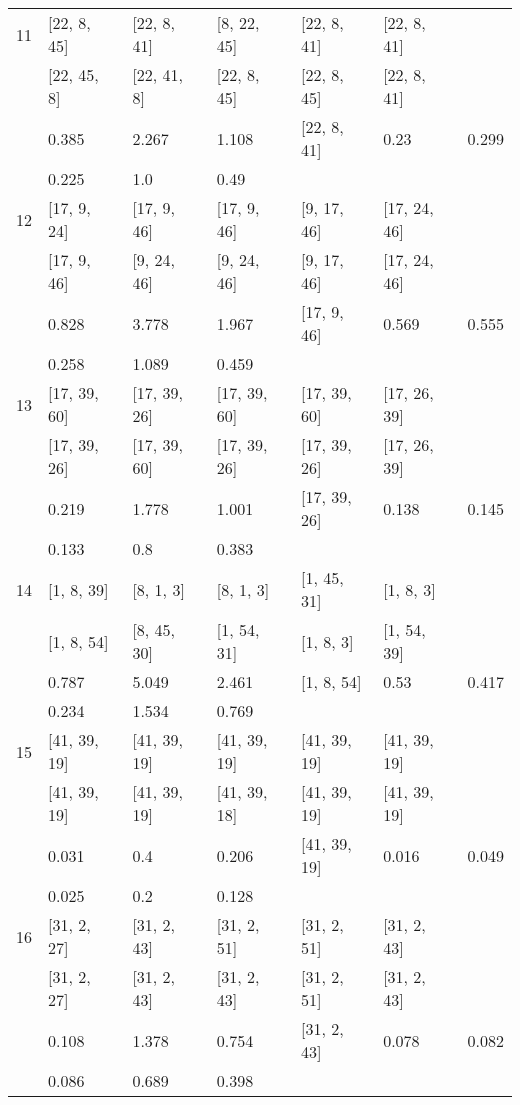 \begin{longtable}{| l || l | l | l | l | l | l | }
\hline
11  & [22, 8, 45] & [22, 8, 41] & [8, 22, 45] & [22, 8, 41] & [22, 8, 41] \\
 & [22, 45, 8] & [22, 41, 8] & [22, 8, 45] & [22, 8, 45] & [22, 8, 41]\\
\hline
& 0.385 & 2.267 & 1.108 & [22, 8, 41] & 0.23 & 0.299\\
\hline
& 0.225 & 1.0 & 0.49 \\
\hline

\hline
12  & [17, 9, 24] & [17, 9, 46] & [17, 9, 46] & [9, 17, 46] & [17, 24, 46] \\
 & [17, 9, 46] & [9, 24, 46] & [9, 24, 46] & [9, 17, 46] & [17, 24, 46]\\
\hline
& 0.828 & 3.778 & 1.967 & [17, 9, 46] & 0.569 & 0.555\\
\hline
& 0.258 & 1.089 & 0.459 \\
\hline

\hline
13  & [17, 39, 60] & [17, 39, 26] & [17, 39, 60] & [17, 39, 60] & [17, 26, 39] \\
 & [17, 39, 26] & [17, 39, 60] & [17, 39, 26] & [17, 39, 26] & [17, 26, 39]\\
\hline
& 0.219 & 1.778 & 1.001 & [17, 39, 26] & 0.138 & 0.145\\
\hline
& 0.133 & 0.8 & 0.383 \\
\hline

\hline
14  & [1, 8, 39] & [8, 1, 3] & [8, 1, 3] & [1, 45, 31] & [1, 8, 3] \\
 & [1, 8, 54] & [8, 45, 30] & [1, 54, 31] & [1, 8, 3] & [1, 54, 39]\\
\hline
& 0.787 & 5.049 & 2.461 & [1, 8, 54] & 0.53 & 0.417\\
\hline
& 0.234 & 1.534 & 0.769 \\
\hline

\hline
15  & [41, 39, 19] & [41, 39, 19] & [41, 39, 19] & [41, 39, 19] & [41, 39, 19] \\
 & [41, 39, 19] & [41, 39, 19] & [41, 39, 18] & [41, 39, 19] & [41, 39, 19]\\
\hline
& 0.031 & 0.4 & 0.206 & [41, 39, 19] & 0.016 & 0.049\\
\hline
& 0.025 & 0.2 & 0.128 \\
\hline

\hline
16  & [31, 2, 27] & [31, 2, 43] & [31, 2, 51] & [31, 2, 51] & [31, 2, 43] \\
 & [31, 2, 27] & [31, 2, 43] & [31, 2, 43] & [31, 2, 51] & [31, 2, 43]\\
\hline
& 0.108 & 1.378 & 0.754 & [31, 2, 43] & 0.078 & 0.082\\
\hline
& 0.086 & 0.689 & 0.398 \\
\hline


\end{longtable}
